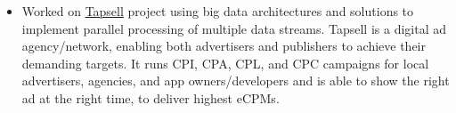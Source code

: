 \documentclass[10pt,a4paper,ragged2e]{altacv}
\begin{document}

    \begin{fullwidth}
        \makecvheader
    \end{fullwidth}



    \begin{itemize}
        \item
        {Worked on {\href{https://tapsell.ir}{Tapsell}} project using big data architectures and solutions to implement parallel
        processing of multiple data streams.
        Tapsell is a digital ad agency/network, enabling both advertisers and publishers to achieve their demanding targets.
        It runs CPI, CPA, CPL, and CPC campaigns for local advertisers,
        agencies, and app owners/developers and is able to show the right ad at the right time, to deliver highest eCPMs.}
    \end{itemize}

    \divider
\end{document}
